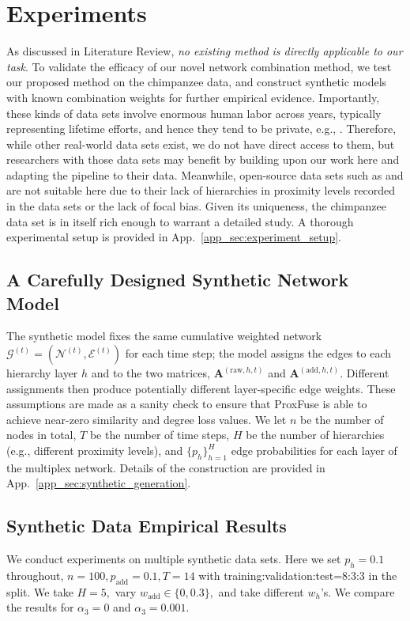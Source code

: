 \documentclass{article}
\theoremstyle{plain}
\theoremstyle{definition}
\theoremstyle{remark}
\begin{document}
\section{Experiments}
\label{sec:experiments}
As discussed in Literature Review, \emph{no existing method is directly applicable to our task}. To validate the efficacy of our novel network combination method, we test our proposed method on the chimpanzee data, and construct synthetic models with known combination weights for further empirical evidence. Importantly, these kinds of data sets involve enormous human labor across years, typically representing lifetime efforts, and hence they tend to be private, e.g., \citet{morrison2021rapid, derby2024female, badihi2022flexibility}. Therefore, while other real-world data sets exist, we do not have direct access to them, but researchers with those data sets may benefit by building upon our work here and adapting the pipeline to their data. Meanwhile, open-source data sets such as \citet{franz2015knockouts} and \citet{lusseau2003bottlenose} are not suitable here due to their lack of hierarchies in proximity levels recorded in the data sets or the lack of focal bias. Given its uniqueness, the chimpanzee data set is in itself rich enough to warrant a detailed study. A thorough experimental setup is provided in App.~\ref{app_sec:experiment_setup}.
\subsection{A Carefully Designed Synthetic Network Model}
The synthetic model fixes the same cumulative weighted network $\mathcal{G}^{(t)}=(\mathcal{N}^{(t)},\mathcal{E}^{(t)})$ for each time step; the model assigns the edges to each hierarchy layer $h$ and to the two matrices, $\mathbf{A}^{(\text{raw}, h,t)}$ and $\mathbf{A}^{(\text{add}, h,t)}$. Different assignments then produce potentially different layer-specific edge weights. These assumptions are made as a sanity check to ensure that ProxFuse is able to achieve near-zero similarity and degree loss values. We let $n$ be the number of nodes in total, $T$ be the number of time steps, $H$ be the number of hierarchies (e.g.,  different proximity levels), and $\{p_h\}_{h=1}^H$ edge probabilities for each layer of the multiplex network. Details of the construction are provided in App.~\ref{app_sec:synthetic_generation}.
\subsection{Synthetic Data Empirical Results}
We conduct experiments on multiple synthetic data sets. Here we set $p_h=0.1$ throughout, $n=100, p_\text{add}=0.1, T=14$ with training:validation:test=8:3:3 in the split. We take $H=5,$ vary $w_\text{add}\in\{0, 0.3\},$ and take different $w_h$'s. We compare the results for $\alpha_3=0$ and $\alpha_3=0.001.$ 
\end{document}
